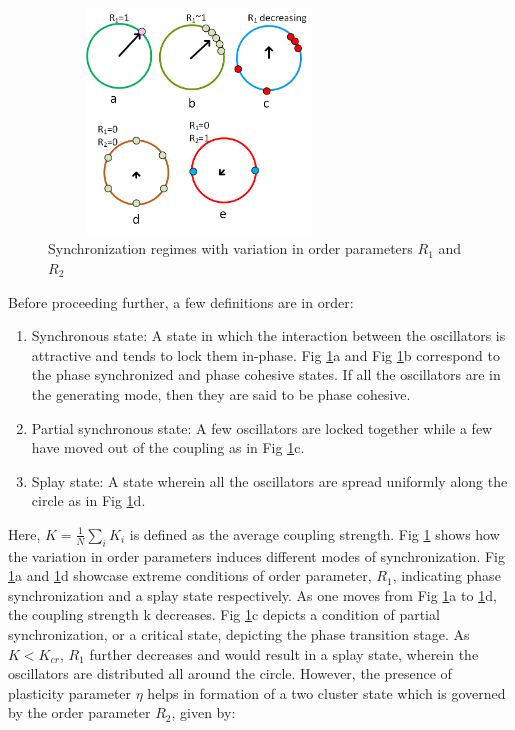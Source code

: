\documentclass{ifacconf}
\begin{document}
\begin{figure}[h!]
\begin{center}
\includegraphics[width=8cm,height=6cm]{mss.png}
\caption{Synchronization regimes with variation in order parameters $R_{1}$ and $R_{2}$}
\label{fig:5}
\end{center}
\end{figure}
Before proceeding further, a few definitions are in order:
\begin{enumerate}
\item Synchronous state: A state in which the interaction between the oscillators is attractive and tends to lock them in-phase. Fig \ref{fig:5}a and Fig \ref{fig:5}b correspond to the phase synchronized and phase cohesive states. If all the oscillators are in the generating mode, then they are said to be phase cohesive. 
\item Partial synchronous state: A few oscillators are locked together while a few have moved out of the coupling as in Fig \ref{fig:5}c.
\item Splay state: A state wherein all the oscillators are spread uniformly along the circle as in Fig \ref{fig:5}d. 
\end{enumerate}
Here, $K=\frac{1}{N} \sum_i K_{i} $ is defined as the average coupling strength. Fig \ref{fig:5} shows how the variation in order parameters induces different modes of synchronization. Fig \ref{fig:5}a and \ref{fig:5}d showcase extreme conditions of order parameter, $R_{1}$, indicating phase synchronization and a splay state respectively. As one moves from Fig \ref{fig:5}a to \ref{fig:5}d, the coupling strength k decreases. Fig \ref{fig:5}c depicts a condition of partial synchronization, or a critical state, depicting the phase transition stage. As $K<K_{cr}$,  $R_{1}$ further decreases and would result in a splay state, wherein the oscillators are distributed all around the circle. However, the presence of plasticity parameter $\eta$ helps in formation of a two cluster state which is governed by the order parameter $ R_{2}$, given by:
\end{document}
